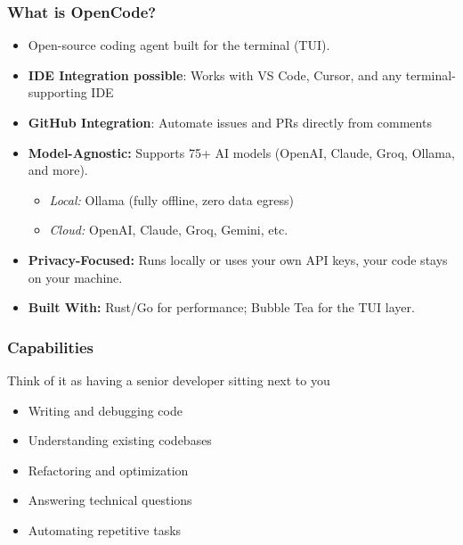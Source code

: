 \begin{frame}[fragile]\frametitle{What is OpenCode?}
  \begin{itemize}
    \item Open-source coding agent built for the terminal (TUI).
	\item \textbf{IDE Integration possible}:	Works with VS Code, Cursor, and any terminal-supporting IDE
	\item \textbf{GitHub Integration}: Automate issues and PRs directly from comments
    \item \textbf{Model-Agnostic:} Supports 75+ AI models (OpenAI, Claude, Groq, Ollama, and more).
      \begin{itemize}
        \item \textit{Local:} Ollama (fully offline, zero data egress)
        \item \textit{Cloud:} OpenAI, Claude, Groq, Gemini, etc.
      \end{itemize}	
    \item \textbf{Privacy-Focused:} Runs locally or uses your own API keys, your code stays on your machine.
    \item \textbf{Built With:} Rust/Go for performance; Bubble Tea for the TUI layer.
  \end{itemize}
\end{frame}

\begin{frame}[fragile]\frametitle{Capabilities}
Think of it as having a senior developer sitting next to you
  \begin{itemize}
    \item Writing and debugging code
    \item Understanding existing codebases
    \item Refactoring and optimization
    \item Answering technical questions
    \item Automating repetitive tasks
  \end{itemize}
\end{frame}



